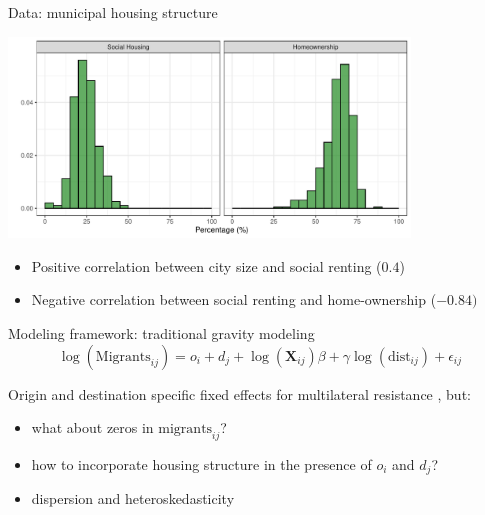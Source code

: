 \documentclass{beamer}
\begin{document}
\begin{frame}{Data: municipal housing structure}
\begin{center}
	\includegraphics[width=0.8\textwidth]{../fig/hist_housing}      
\end{center}
\begin{itemize}
	\item Positive correlation between city size and social renting ($0.4$)
	\item Negative correlation between social renting and home-ownership ($-0.84)$
\end{itemize}
\end{frame}

\begin{frame}{Modeling framework: traditional gravity modeling}
	\begin{equation*}
	\log(\text{Migrants}_{ij}) = o_i + d_j +  \log(\mathbf{X}_{ij})\beta + \gamma\log(\text{dist}_{ij}) + \epsilon_{ij}
	\label{eq:gravfixed}
	\end{equation*} 
	
	Origin and destination specific \alert{fixed} effects for multilateral resistance \citep{anderson2003gravity}, but:
	\begin{itemize}
		\item what about \alert{zeros} in $\text{migrants}_{ij}$?
		\item how to incorporate \alert{housing} structure in the presence of $o_i$ and $d_j$?
		\item \alert{dispersion} and \alert{heteroskedasticity} \citep{silva2006log}
	\end{itemize}
\end{frame}
\end{document}
